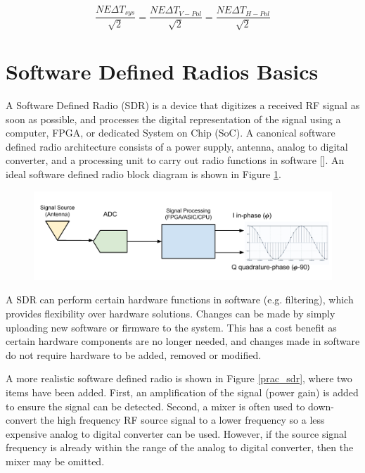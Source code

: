\begin{equation}\label{correlating_neat}
\frac{NE\Delta T_{sys}}{\sqrt{2}} = \frac{NE\Delta T_{V-Pol}}{\sqrt{2}} = \frac{NE\Delta T_{H-Pol}}{\sqrt{2}}
\end{equation}
 
\section{Software Defined Radios Basics} 
A Software Defined Radio (SDR) is a device that digitizes a received RF signal as soon as possible, and processes the digital representation of the signal using a computer, FPGA, or dedicated System on Chip (SoC).  A canonical software defined radio architecture consists of a power supply, antenna, analog to digital converter, and a processing unit to carry out radio functions in software [\cite{Mitola1995}]. An ideal software defined radio block diagram is shown in Figure \ref{ideal_sdr}.

{\begin{figure}[h!tb] 
\centering
\includegraphics[width=\textwidth]{Images/SDR_Ideal_block.pdf}
\label{ideal_sdr}
\end{figure}
}

A SDR can perform certain hardware functions in software (e.g. filtering), which provides flexibility over hardware solutions.  Changes can be made by simply uploading new software or firmware to the system.  This has a cost benefit as certain hardware components are no longer needed, and changes made in software do not require hardware to be added, removed or modified.

A more realistic software defined radio is shown in Figure \ref{prac_sdr}, where two items have been added.  First, an amplification of the signal (power gain) is added to ensure the signal can be detected.  Second, a mixer is often used to down-convert the high frequency RF source signal to a lower frequency so a less expensive analog to digital converter can be used.  However, if the source signal frequency is already within the range of the analog to digital converter, then the mixer may be omitted.   


